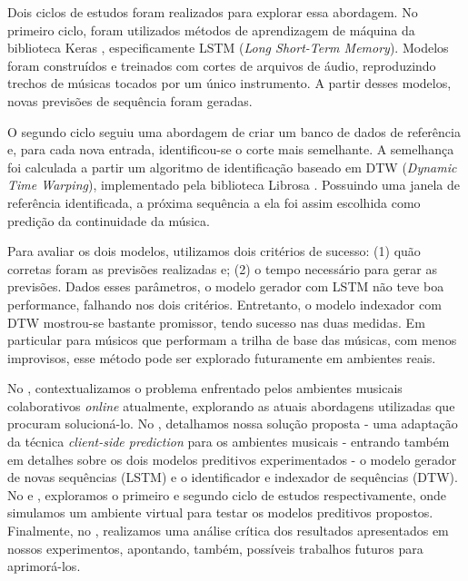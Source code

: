 Dois ciclos de estudos foram realizados para explorar essa abordagem. No primeiro ciclo, foram utilizados métodos de aprendizagem de máquina da biblioteca Keras \cite{keras}, especificamente LSTM (\textit{Long Short-Term Memory})\cite{lstm}. Modelos foram construídos e treinados com cortes de arquivos de áudio, reproduzindo trechos de músicas tocados por um único instrumento. A partir desses modelos, novas previsões de sequência foram geradas.

O segundo ciclo seguiu uma abordagem de criar um banco de dados de referência e, para cada nova entrada, identificou-se o corte mais semelhante. A semelhança foi calculada a partir um algoritmo de identificação baseado em DTW (\textit{Dynamic Time Warping})\cite{dtw}, implementado pela biblioteca Librosa \cite{librosa}. Possuindo uma janela de referência identificada, a próxima sequência a ela foi assim escolhida como predição da continuidade da música.

Para avaliar os dois modelos, utilizamos dois critérios de sucesso: (1) quão corretas foram as previsões realizadas e; (2) o tempo necessário para gerar as previsões. Dados esses parâmetros, o modelo gerador com LSTM não teve boa performance, falhando nos dois critérios. Entretanto, o modelo indexador com DTW mostrou-se bastante promissor, tendo sucesso nas duas medidas. Em particular para músicos que performam a trilha de base das músicas, com menos improvisos, esse método pode ser explorado futuramente em ambientes reais.

No , contextualizamos o problema enfrentado pelos ambientes musicais colaborativos \textit{online} atualmente, explorando as atuais abordagens utilizadas que procuram solucioná-lo. No , detalhamos nossa solução proposta - uma adaptação da técnica \textit{client-side prediction} para os ambientes musicais - entrando também em detalhes sobre os dois modelos preditivos experimentados - o modelo gerador de novas sequências (LSTM) e o identificador e indexador de sequências (DTW). No  e , exploramos o primeiro e segundo ciclo de estudos respectivamente, onde simulamos um ambiente virtual para testar os modelos preditivos propostos. Finalmente, no , realizamos uma análise crítica dos resultados apresentados em nossos experimentos, apontando, também, possíveis trabalhos futuros para aprimorá-los.